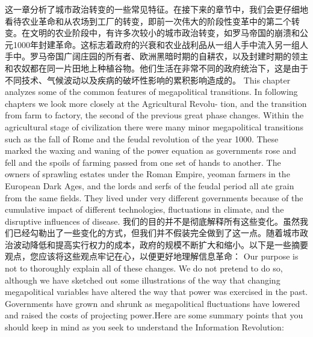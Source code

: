 \begin{paracol}{2}
这一章分析了城市政治转变的一些常见特征。在接下来的章节中，我们会更仔细地看待农业革命和从农场到工厂的转变，即前一次伟大的阶段性变革中的第二个转变。在文明的农业阶段中，有许多次较小的城市政治转变，如罗马帝国的崩溃和公元1000年封建革命。这标志着政府的兴衰和农业战利品从一组人手中流入另一组人手中。罗马帝国广阔庄园的所有者、欧洲黑暗时期的自耕农，以及封建时期的领主和农奴都在同一片田地上种植谷物。他们生活在非常不同的政府统治下，这是由于不同技术、气候波动以及疾病的破坏性影响的累积影响造成的。
\switchcolumn
This chapter analyzes some of the common features of megapolitical transitions. In following chapters we look more closely at the Agricultural Revolu- tion, and the transition from farm to factory, the second of the previous great phase changes. Within the agricultural stage of civilization there were many minor megapolitical transitions such as the fall of Rome and the feudal revolution of the year 1000. These marked the waxing and waning of the power equation as governments rose and fell and the spoils of farming passed from one set of hands to another. The owners of sprawling estates under the Roman Empire, yeoman farmers in the European Dark Ages, and the lords and serfs of the feudal period all ate grain from the same fields. They lived under very different governments because of the cumulative impact of different technologies, fluctuations in climate, and the disruptive influences of disease.
\switchcolumn*
我们的目的并不是彻底解释所有这些变化。虽然我们已经勾勒出了一些变化的方式，但我们并不假装完全做到了这一点。随着城市政治波动降低和提高实行权力的成本，政府的规模不断扩大和缩小。以下是一些摘要观点，您应该将这些观点牢记在心，以便更好地理解信息革命：
\switchcolumn
Our purpose is not to thoroughly explain all of these changes. We do not pretend to do so, although we have sketched out some illustrations of the way that changing megapolitical variables have altered the way that power was exercised in the past. Governments have grown and shrunk as megapolitical fluctuations have lowered and raised the costs of projecting power.Here are some summary points that you should keep in mind as you seek to understand the Information Revolution:
\switchcolumn*
\switchcolumn
    
\switchcolumn*
\switchcolumn
    
\switchcolumn*
\switchcolumn
    
    
\end{paracol}





